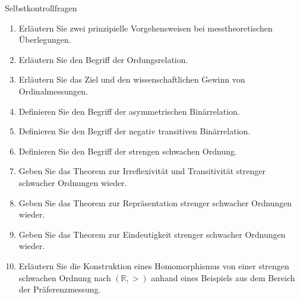 \documentclass[
  8pt,
  ignorenonframetext,
]{beamer}
\providecommand{\tightlist}{%
  \setlength{\itemsep}{0pt}\setlength{\parskip}{0pt}}
\begin{document}
\begin{frame}{Selbstkontrollfragen}
\protect\hypertarget{selbstkontrollfragen}{}
\footnotesize
{}

\begin{enumerate}
\tightlist
\item
  Erläutern Sie zwei prinzipielle Vorgehensweisen bei messtheoretischen
  Überlegungen.
\item
  Erläutern Sie den Begriff der Ordungsrelation.
\item
  Erläutern Sie das Ziel und den wissenschaftlichen Gewinn von
  Ordinalmessungen.
\item
  Definieren Sie den Begriff der asymmetrischen Binärrelation.
\item
  Definieren Sie den Begriff der negativ transitiven Binärrelation.
\item
  Definieren Sie den Begriff der strengen schwachen Ordnung.
\item
  Geben Sie das Theorem zur Irreflexivität und Transitivität strenger
  schwacher Ordnungen wieder.
\item
  Geben Sie das Theorem zur Repräsentation strenger schwacher Ordnungen
  wieder.
\item
  Geben Sie das Theorem zur Eindeutigkeit strenger schwacher Ordnungen
  wieder.
\item
  Erläutern Sie die Konstruktion eines Homomorphismus von einer strengen
  schwachen Ordnung nach \((\mathbb{R},>)\) anhand eines Beispiels aus
  dem Bereich der Präferenzmessung.
\end{enumerate}
\end{frame}
\end{document}
